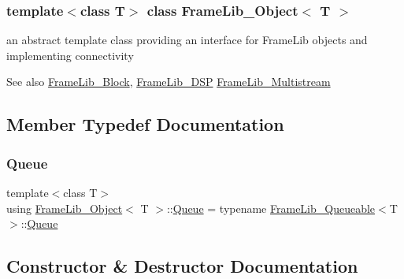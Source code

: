 \subsubsection*{template$<$class T$>$\newline
class Frame\+Lib\+\_\+\+Object$<$ T $>$}

an abstract template class providing an interface for Frame\+Lib objects and implementing connectivity 

\begin{DoxySeeAlso}{See also}
\hyperlink{class_frame_lib___block}{Frame\+Lib\+\_\+\+Block}, \hyperlink{class_frame_lib___d_s_p}{Frame\+Lib\+\_\+\+D\+SP} \hyperlink{class_frame_lib___multistream}{Frame\+Lib\+\_\+\+Multistream} 
\end{DoxySeeAlso}


\subsection{Member Typedef Documentation}
\mbox{\label{class_frame_lib___object_a3e6fce9a979bf08406e40e51583cb4ea}} 
\subsubsection{\texorpdfstring{Queue}{Queue}}
{\footnotesize\ttfamily template$<$class T$>$ \\
using \hyperlink{class_frame_lib___object}{Frame\+Lib\+\_\+\+Object}$<$ T $>$\+::\hyperlink{class_frame_lib___object_a3e6fce9a979bf08406e40e51583cb4ea}{Queue} =  typename \hyperlink{class_frame_lib___queueable}{Frame\+Lib\+\_\+\+Queueable}$<$T$>$\+::\hyperlink{class_frame_lib___object_a3e6fce9a979bf08406e40e51583cb4ea}{Queue}}



\subsection{Constructor \& Destructor Documentation}
\mbox{\label{class_frame_lib___object_ae377e7fd8ca51210af511a9fdc2544e7}} 
